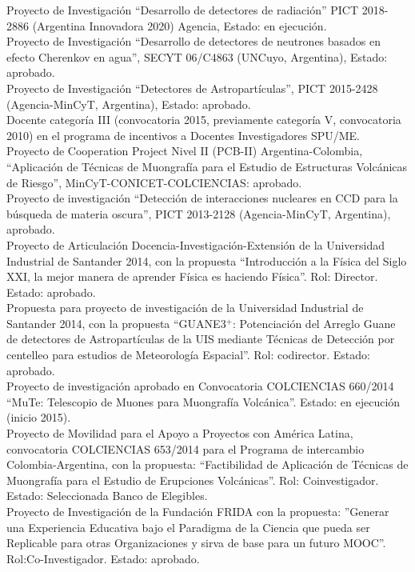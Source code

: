  Proyecto de Investigación ``Desarrollo de detectores de radiación'' PICT 2018-2886 (Argentina Innovadora 2020) Agencia, Estado: en ejecución.\\
 Proyecto de Investigación ``Desarrollo de detectores de neutrones basados en efecto Cherenkov en agua'', SECYT 06/C4863 (UNCuyo, Argentina), Estado: aprobado.\\
 Proyecto de Investigación ``Detectores de Astropartículas'', PICT 2015-2428 (Agencia-MinCyT, Argentina), Estado: aprobado.\\
 Docente categoría III (convocatoria 2015, previamente categoría V, convocatoria 2010) en el programa de incentivos a Docentes Investigadores SPU/ME.\\
\ifres
\else
{} Proyecto de Cooperation Project Nivel II (PCB-II) Argentina-Colombia, ``Aplicación de Técnicas de Muongrafía para el Estudio de Estructuras Volcánicas de Riesgo'', MinCyT-CONICET-COLCIENCIAS: aprobado.\\
 Proyecto de investigación ``Detección de interacciones nucleares en CCD para la búsqueda de materia oscura'', PICT 2013-2128 (Agencia-MinCyT, Argentina), aprobado.\\
 Proyecto de Articulación Docencia-Investigación-Extensión de la Universidad Industrial de Santander 2014, con la propuesta ``Introducción a la Física del Siglo XXI, la mejor manera de aprender Física es haciendo Física''. Rol: Director. Estado: aprobado.\\
 Propuesta para proyecto de investigación de la Universidad Industrial de Santander 2014, con la propuesta ``GUANE3$^+$: Potenciación del Arreglo Guane de detectores de Astropartículas de la UIS mediante Técnicas de Detección por centelleo para estudios de Meteorología Espacial''. Rol: codirector. Estado: aprobado.\\
 Proyecto de investigación aprobado en Convocatoria COLCIENCIAS 660/2014 ``MuTe: Telescopio de Muones para Muongrafía Volcánica''. Estado: en ejecución (inicio 2015).\\
 Proyecto de Movilidad para el Apoyo a Proyectos con América Latina, convocatoria COLCIENCIAS 653/2014 para el Programa de intercambio Colombia-Argentina, con la propuesta: ``Factibilidad de Aplicación de Técnicas de Muongrafía para el Estudio de Erupciones Volcánicas''. Rol: Coinvestigador. Estado: Seleccionada Banco de Elegibles.\\
 Proyecto de Investigación de la Fundación FRIDA con la propuesta: ''Generar una Experiencia Educativa bajo el Paradigma de la Ciencia que pueda ser Replicable para otras Organizaciones y sirva de base para un futuro MOOC''. Rol:Co-Investigador. Estado: aprobado.\\
